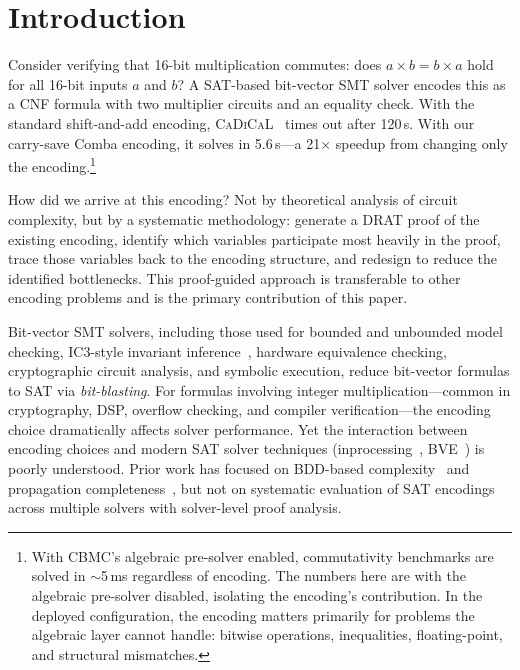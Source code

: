 \documentclass[a4paper]{ceurart}
\newcommand{\cadical}{\textsc{CaDiCaL}\xspace}
\newcommand{\cbmc}{\textsc{CBMC}\xspace}
\begin{document}

\maketitle

\section{Introduction}

Consider verifying that 16-bit multiplication commutes: does
$a \times b = b \times a$ hold for all 16-bit inputs $a$ and $b$?
A SAT-based bit-vector SMT solver encodes this as a CNF formula
with two multiplier circuits and an equality check. With the
standard shift-and-add encoding, \cadical~\cite{biere2019cadical}
times out after 120\,s. With our carry-save Comba encoding, it
solves in 5.6\,s---a 21$\times$ speedup from changing only the
encoding.\footnote{With \cbmc's algebraic pre-solver enabled,
commutativity benchmarks are solved in
${\sim}$5\,ms regardless of encoding. The numbers here are with
the algebraic pre-solver disabled, isolating the encoding's
contribution. In the deployed configuration, the encoding matters
primarily for problems the algebraic layer cannot handle:
bitwise operations, inequalities, floating-point, and structural
mismatches.}

How did we arrive at this encoding? Not by theoretical analysis of
circuit complexity, but by a systematic methodology: generate a DRAT
proof of the existing encoding, identify which variables participate
most heavily in the proof, trace those variables back to the encoding
structure, and redesign to reduce the identified bottlenecks. This
proof-guided approach is transferable to other encoding problems and
is the primary contribution of this paper.

Bit-vector SMT solvers, including those used for bounded and
unbounded model checking, IC3-style invariant
inference~\cite{bradley2011sat}, hardware equivalence
checking, cryptographic circuit analysis, and symbolic execution,
reduce bit-vector formulas to SAT via \emph{bit-blasting}. For
formulas involving integer multiplication---common in cryptography,
DSP, overflow checking, and compiler verification---the encoding
choice dramatically affects solver performance. Yet the interaction
between encoding choices and modern
SAT solver techniques
(inprocessing~\cite{jarvisalo2012inprocessing},
BVE~\cite{een2005effective}) is poorly understood. Prior work has
focused on BDD-based complexity~\cite{bryant1991complexity} and
propagation completeness~\cite{brain2016propagation,brain2021wrong},
but not on systematic evaluation of SAT encodings across multiple
solvers with solver-level proof analysis.
\end{document}
